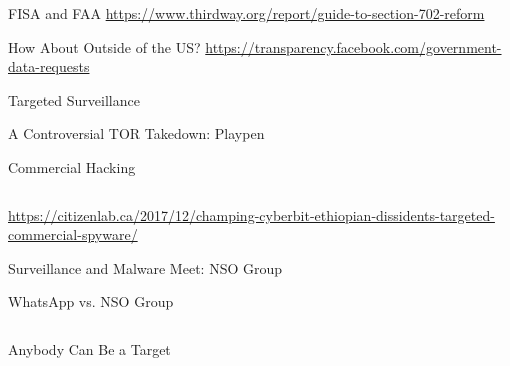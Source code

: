 \documentclass[nobackground,dvipsnames,table]{beamer}
\begin{document}
\begin{frame}{FISA and FAA}
    \tiny
    \url{https://www.thirdway.org/report/guide-to-section-702-reform}
\end{frame}

\begin{frame}{How About Outside of the US?}
    \tiny
    \url{https://transparency.facebook.com/government-data-requests}
\end{frame}

\begin{frame}{}%
    Targeted Surveillance
\end{frame}

\begin{frame}{A Controversial TOR Takedown: Playpen}
\end{frame}

\begin{frame}{Commercial Hacking}
    \begin{columns}
    \end{columns}
    \tiny
    \url{https://citizenlab.ca/2017/12/champing-cyberbit-ethiopian-dissidents-targeted-commercial-spyware/}
\end{frame}

\begin{frame}{Surveillance and Malware Meet: NSO Group}
\end{frame}

\begin{frame}{WhatsApp vs. NSO Group}
    \begin{columns}
    \end{columns}
\end{frame}

\begin{frame}{Anybody Can Be a Target}
    \begin{columns}
    \end{columns}
\end{frame}
\end{document}
